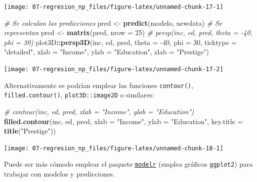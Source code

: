 \documentclass[
]{book}
\newenvironment{Shaded}{\begin{snugshade}}{\end{snugshade}}
\newcommand{\CommentTok}[1]{\textcolor[rgb]{0.56,0.35,0.01}{\textit{#1}}}
\newcommand{\DataTypeTok}[1]{\textcolor[rgb]{0.13,0.29,0.53}{#1}}
\newcommand{\DecValTok}[1]{\textcolor[rgb]{0.00,0.00,0.81}{#1}}
\newcommand{\KeywordTok}[1]{\textcolor[rgb]{0.13,0.29,0.53}{\textbf{#1}}}
\newcommand{\NormalTok}[1]{#1}
\newcommand{\OperatorTok}[1]{\textcolor[rgb]{0.81,0.36,0.00}{\textbf{#1}}}
\newcommand{\StringTok}[1]{\textcolor[rgb]{0.31,0.60,0.02}{#1}}
\theoremstyle{break}
\theoremstyle{definition}
\theoremstyle{definition}
\theoremstyle{definition}
\theoremstyle{remark}
\begin{document}
\begin{center}\texttt{[image: 07-regresion\_np\_files/figure-latex/unnamed-chunk-17-1]} \end{center}

\begin{Shaded}
\begin{Highlighting}[]
\CommentTok{# Se calculan las predicciones}
\NormalTok{pred <-}\StringTok{ }\KeywordTok{predict}\NormalTok{(modelo, newdata)}
\CommentTok{# Se representan}
\NormalTok{pred <-}\StringTok{ }\KeywordTok{matrix}\NormalTok{(pred, }\DataTypeTok{nrow =} \DecValTok{25}\NormalTok{)}
\CommentTok{# persp(inc, ed, pred, theta = -40, phi = 30)}
\NormalTok{plot3D}\OperatorTok{::}\KeywordTok{persp3D}\NormalTok{(inc, ed, pred, }\DataTypeTok{theta =} \DecValTok{-40}\NormalTok{, }\DataTypeTok{phi =} \DecValTok{30}\NormalTok{, }\DataTypeTok{ticktype =} \StringTok{"detailed"}\NormalTok{,}
                \DataTypeTok{xlab =} \StringTok{"Income"}\NormalTok{, }\DataTypeTok{ylab =} \StringTok{"Education"}\NormalTok{, }\DataTypeTok{zlab =} \StringTok{"Prestige"}\NormalTok{)}
\end{Highlighting}
\end{Shaded}

\begin{center}\texttt{[image: 07-regresion\_np\_files/figure-latex/unnamed-chunk-17-2]} \end{center}

Alternativamente se podrían emplear las funciones \texttt{contour()}, \texttt{filled.contour()}, \texttt{plot3D::image2D} o similares:

\begin{Shaded}
\begin{Highlighting}[]
\CommentTok{# contour(inc, ed, pred, xlab = "Income", ylab = "Education")}
\KeywordTok{filled.contour}\NormalTok{(inc, ed, pred, }\DataTypeTok{xlab =} \StringTok{"Income"}\NormalTok{, }\DataTypeTok{ylab =} \StringTok{"Education"}\NormalTok{, }\DataTypeTok{key.title =} \KeywordTok{title}\NormalTok{(}\StringTok{"Prestige"}\NormalTok{))}
\end{Highlighting}
\end{Shaded}

\begin{center}\texttt{[image: 07-regresion\_np\_files/figure-latex/unnamed-chunk-18-1]} \end{center}

Puede ser más cómodo emplear el paquete \href{https://modelr.tidyverse.org}{\texttt{modelr}} (emplea gráficos \texttt{ggplot2}) para trabajar con modelos y predicciones.
\end{document}
